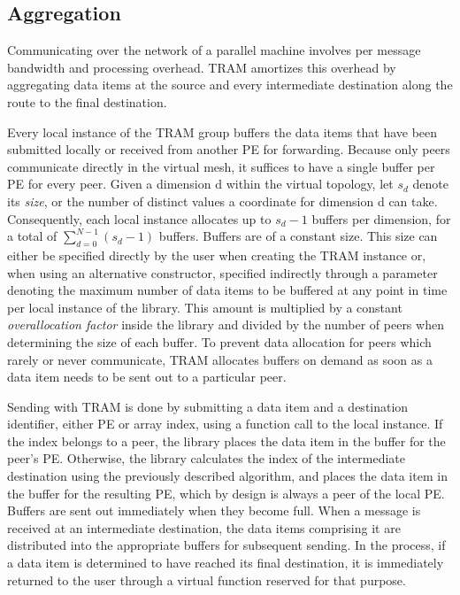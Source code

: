 \subsection{Aggregation}

Communicating over the network of a parallel machine involves per
message bandwidth and processing overhead. TRAM amortizes
this overhead by aggregating data items at the source and every
intermediate destination along the route to the final destination.

Every local instance of the TRAM group buffers the data items
that have been submitted locally or received from another PE for
forwarding. Because only peers communicate directly in the virtual
mesh, it suffices to have a single buffer per PE for every
peer. Given a dimension d within the virtual topology, let $s_d$
denote its \emph{size}, or the number of distinct values a coordinate
for dimension d can take. Consequently, each local instance allocates
up to $s_d - 1 $ buffers per dimension, for a total of
$\sum_{d=0}^{N-1} (s_d - 1) $ buffers. Buffers are of a constant
size. This size can either be specified directly by the user when
creating the TRAM instance or, when using an alternative
constructor, specified indirectly through a parameter denoting the
maximum number of data items to be buffered at any point in time per
local instance of the library.  This amount is multiplied by a
constant \emph{overallocation factor} inside the library and divided
by the number of peers when determining the size of each
buffer. To prevent data allocation for peers which rarely or never
communicate, TRAM allocates buffers on demand as soon as a
data item needs to be sent out to a particular peer.

Sending with TRAM is done by submitting a data item and a
destination identifier, either PE or array index, using a function
call to the local instance.  If the index belongs to a peer, the
library places the data item in the buffer for the peer's
PE. Otherwise, the library calculates the index of the intermediate
destination using the previously described algorithm, and places the
data item in the buffer for the resulting PE, which by design is
always a peer of the local PE. Buffers are sent out immediately
when they become full. When a message is received at an intermediate
destination, the data items comprising it are distributed into the
appropriate buffers for subsequent sending. In the process, if a data
item is determined to have reached its final destination, it is
immediately returned to the user through a virtual function reserved
for that purpose.


